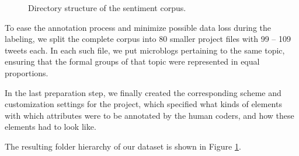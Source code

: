 \begin{figure}
  \begin{minipage}[t][24.5em]{0.5\textwidth}%
    \hspace{3em}
  \end{minipage}

  \begin{minipage}[b]{0.5\textwidth}
  \caption{Directory structure of the sentiment
    corpus.\label{fig:snt:corpus}}%
  \end{minipage}
\end{figure}

To ease the annotation process and minimize possible data loss during
the labeling, we split the complete corpus into 80 smaller project
files with 99 -- 109 tweets each.  In each such file, we put
microblogs pertaining to the same topic, ensuring that the formal
groups of that topic were represented in equal proportions.

In the last preparation step, we finally created the corresponding
scheme and customization settings for the project, which specified
what kinds of elements with which attributes were to be annotated by
the human coders, and how these elements had to look like.

The resulting folder hierarchy of our dataset is shown in Figure
\ref{fig:snt:corpus}.

